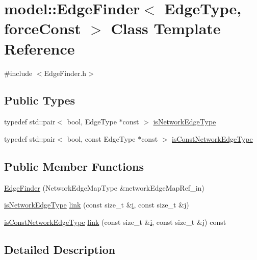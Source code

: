 \hypertarget{classmodel_1_1_edge_finder}{}\section{model\+:\+:Edge\+Finder$<$ Edge\+Type, force\+Const $>$ Class Template Reference}
\label{classmodel_1_1_edge_finder}


{\ttfamily \#include $<$Edge\+Finder.\+h$>$}

\subsection*{Public Types}
\begin{DoxyCompactItemize}
\item 
typedef std\+::pair$<$ bool, Edge\+Type $\ast$const  $>$ \hyperlink{classmodel_1_1_edge_finder_a86f4f60cced5f7a8865b9325c7f73a73}{is\+Network\+Edge\+Type}
\item 
typedef std\+::pair$<$ bool, const Edge\+Type $\ast$const  $>$ \hyperlink{classmodel_1_1_edge_finder_a7540ff799b6bec42eb8d97aca320b398}{is\+Const\+Network\+Edge\+Type}
\end{DoxyCompactItemize}
\subsection*{Public Member Functions}
\begin{DoxyCompactItemize}
\item 
\hyperlink{classmodel_1_1_edge_finder_ae40024ef37e1956df62d7f308c6b511e}{Edge\+Finder} (Network\+Edge\+Map\+Type \&network\+Edge\+Map\+Ref\+\_\+in)
\item 
\hyperlink{classmodel_1_1_edge_finder_a86f4f60cced5f7a8865b9325c7f73a73}{is\+Network\+Edge\+Type} \hyperlink{classmodel_1_1_edge_finder_a4768f8afd8b0c960c05a9c58d0a49692}{link} (const size\+\_\+t \&\hyperlink{_cubic_spline_intersection_8m_a6f6ccfcf58b31cb6412107d9d5281426}{i}, const size\+\_\+t \&j)
\item 
\hyperlink{classmodel_1_1_edge_finder_a7540ff799b6bec42eb8d97aca320b398}{is\+Const\+Network\+Edge\+Type} \hyperlink{classmodel_1_1_edge_finder_a2d03dfc5ce66381062604ed8eea7cab6}{link} (const size\+\_\+t \&\hyperlink{_cubic_spline_intersection_8m_a6f6ccfcf58b31cb6412107d9d5281426}{i}, const size\+\_\+t \&j) const 
\end{DoxyCompactItemize}


\subsection{Detailed Description}
